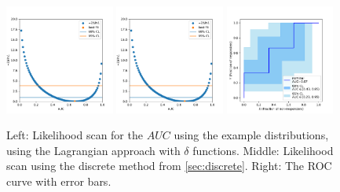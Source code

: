 \documentclass[11pt]{article}
\newcommand{\AUC}{AUC}
\begin{document}
\begin{figure}
\begin{center}
\includegraphics[width=0.32\textwidth]{deltafunctions_scan.pdf}
\includegraphics[width=0.32\textwidth]{discrete_scan_compare_to_delta_functions.pdf}
\includegraphics[width=0.32\textwidth]{deltafunctions_exampleroc_errors.pdf}
\caption{Left: Likelihood scan for the \(\AUC\) using the example distributions, using the Lagrangian approach with \(\delta\) functions.  Middle: Likelihood scan using the discrete method from \cref{sec:discrete}.  Right: The ROC curve with error bars.\label{fig:exampledata_delta_functions_agreement}}
\end{center}
\end{figure}
\end{document}
